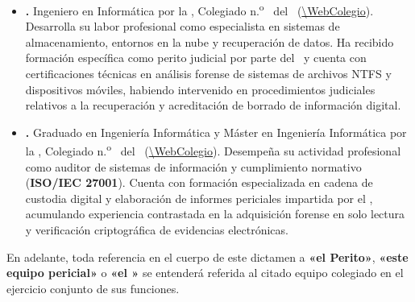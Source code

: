 \begin{itemize}[leftmargin=1.4em, itemsep=0.6em]
	\item \begin{sloppypar}
		\textbf{\PeritoTres.} Ingeniero en Informática por la \UniversidadPerito, Colegiado n.\textsuperscript{o} \NumColegiadoTres\ del \ColegioProfesional\ (\url{\WebColegio}). Desarrolla su labor profesional como especialista en sistemas de almacenamiento, entornos en la nube y recuperación de datos. Ha recibido formación específica como perito judicial por parte del \ColegioProfesional\ y cuenta con certificaciones técnicas en análisis forense de sistemas de archivos NTFS y dispositivos móviles, habiendo intervenido en procedimientos judiciales relativos a la recuperación y acreditación de borrado de información digital.
	\end{sloppypar}
	
	\item \begin{sloppypar}
		\textbf{\PeritoCuatro.} Graduado en Ingeniería Informática y Máster en Ingeniería Informática por la \UniversidadPerito, Colegiado n.\textsuperscript{o} \NumColegiadoCuatro\ del \ColegioProfesional\ (\url{\WebColegio}). Desempeña su actividad profesional como auditor de sistemas de información y cumplimiento normativo (\textbf{ISO/IEC 27001}). Cuenta con formación especializada en cadena de custodia digital y elaboración de informes periciales impartida por el \ColegioProfesional, acumulando experiencia contrastada en la adquisición forense en solo lectura y verificación criptográfica de evidencias electrónicas.
	\end{sloppypar}
\end{itemize}

\vspace{0.2cm}
En adelante, toda referencia en el cuerpo de este dictamen a \textbf{«el Perito»}, \textbf{«este equipo pericial»} o \textbf{«el \GrupoPracticas»} se entenderá referida al citado equipo colegiado en el ejercicio conjunto de sus funciones.